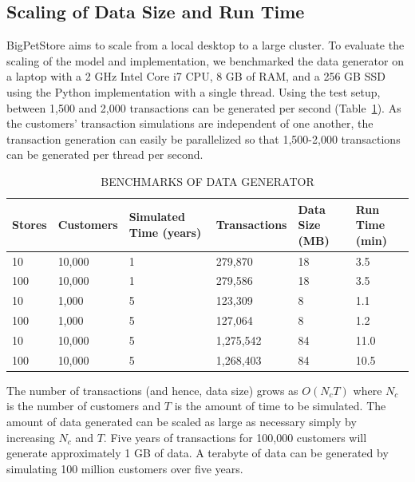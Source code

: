 \subsection{Scaling of Data Size and Run Time}
BigPetStore aims to scale from a local desktop to a large cluster. To evaluate the scaling of the model and implementation, we benchmarked the data generator on a laptop with a 2 GHz Intel Core i7 CPU, 8 GB of RAM, and a 256 GB SSD using the Python implementation with a single thread. Using the test setup, between 1,500 and 2,000 transactions can be generated per second (Table~\ref{tab:benchmarks}). As the customers' transaction simulations are independent of one another, the transaction generation can easily be parallelized so that 1,500-2,000 transactions can be generated per thread per second.

\begin{table}[!t]
\caption{\uppercase{Benchmarks of Data Generator}}
\label{tab:benchmarks}
\centering
\begin{tabular}{ p{1cm} p{1.75cm} p{2cm} p{2.25cm} p{1.5cm} p{1.5cm} }
\hline
Stores & Customers & Simulated Time (years) & Transactions & Data Size (MB) & Run Time (min)\\ \hline
10 & 10,000 & 1 & 279,870 & 18 & 3.5 \\ \hline
100 & 10,000 & 1 & 279,586 & 18 & 3.5 \\ \hline
10 & 1,000 & 5 & 123,309 & 8 & 1.1 \\ \hline
100 & 1,000 & 5 & 127,064 & 8 & 1.2 \\ \hline
10 & 10,000 & 5 & 1,275,542 & 84 & 11.0 \\ \hline
100 & 10,000 & 5 & 1,268,403 & 84 & 10.5 \\ \hline
\end{tabular}
\end{table}

The number of transactions (and hence, data size) grows as $O(N_c T)$ where $N_c$ is the number of customers and $T$ is the amount of time to be simulated. The amount of data generated can be scaled as large as necessary simply by increasing $N_c$ and $T$. Five years of transactions for 100,000 customers will generate approximately 1 GB of data. A terabyte of data can be generated by simulating 100 million customers over five years. 

